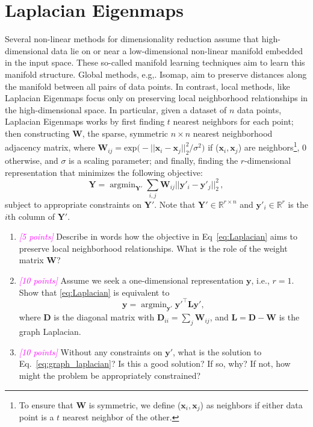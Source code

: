 \documentclass{exam}
\newcommand{\argmin}{\operatorname{argmin}}
\newcommand{\W}{\mathbf{W}}
\newcommand{\Y}{\mathbf{Y}}
\renewcommand{\L}{\mathbf{L}}
\newcommand{\y}{\mathbf{y}}
\newcommand{\x}{\mathbf{x}}
\newcommand{\mD}{\mathbf{D}}
\newcommand{\grade}[1]{\small\textcolor{magenta}{\emph{[#1 points]}} \normalsize}
\begin{document}
\section{Laplacian Eigenmaps}
Several non-linear methods for dimensionality reduction assume that high-dimensional data lie on or near a low-dimensional non-linear manifold
embedded in the input space. 
These so-called manifold learning techniques  aim to learn this manifold structure. Global methods, e.g,. Isomap, aim to preserve distances along the manifold between all pairs of data points. In contrast, local methods, like Laplacian Eigenmaps focus only on preserving local neighborhood relationships in the high-dimensional space. In particular, given a dataset of $n$ data points, Laplacian Eigenmaps works by first finding $t$ nearest neighbors for each point; then constructing $\W$, the sparse, symmetric $n \times n$ nearest neighborhood adjacency matrix, where $\W_{ij} =
\textrm{exp}\big (-||\x_i-\x_j||_2^2 / \sigma^2 \big)$ if
($\x_i,\x_j$) are neighbors\footnote{To ensure that $\W$ is symmetric, we define ($\x_i,\x_j$) as neighbors if either data point is a $t$ nearest neighbor of the other.}, $0$ otherwise, and $\sigma$ is a scaling
parameter; and finally, finding the $r$-dimensional representation that minimizes the following objective:
\begin{equation} 
\label{eq:Laplacian}
\Y=\argmin_{\Y'}  \sum_{i,j}\W_{ij}||\y'_i - \y'_j||_2^2 \,,
\end{equation} 
subject to appropriate constraints on $\Y'$. Note that $\Y' \in \mathbb{R}^{r \times n}$ and $\y'_i \in \mathbb{R}^r$ is the $i$th column of $\Y'$.
\begin{enumerate}[label=(\alph*)]
\item \grade{5} Describe in words how the objective in Eq~\eqref{eq:Laplacian} aims to preserve local neighborhood relationships.  What is the role of the weight matrix $\W$?

\newpage
\item  \grade{10} Assume we seek a one-dimensional representation $\y$, i.e., $r=1$. Show that \eqref{eq:Laplacian} is equivalent to 
\begin{equation}
\label{eq:graph_laplacian}
\y=\argmin_{\y'} \y'^\top \L \y',
\end{equation}
where $\mD$ is the diagonal matrix with $\mD_{ii} = \sum_j \W_{ij}$, and $\L = \mD - \W$ is the graph Laplacian.


\newpage
\item \grade{10} Without any constraints on $\y'$, what is the solution to Eq.~\eqref{eq:graph_laplacian}?  Is this a good solution?  If so, why?  If not, how might the problem be appropriately constrained? 


\end{enumerate}
\end{document}
